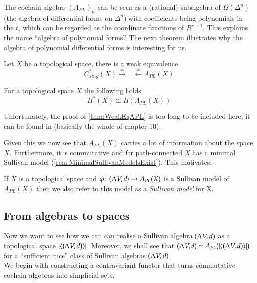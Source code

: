  The cochain algebra ${(A_{PL})}_n$ can be seen as a (rational) subalgebra of 
 $\Omega(\Delta^n)$ (the algebra of differential forms on  $\Delta^n$) with coefficients being polynomials in
 the $t_i$ which can be regarded as the coordinate functions of $R^{n+1}$. This explains the name 
 ``algebra of polynomial forms''.
 The next theorem illustrates why the algebra of polynomial differential forms is interesting for us.
 
 \begin{Theorem}
 \label{thm:WeakEqAPL}
  Let $X$ be a topological space, there is a weak equivalence 
  $${C^*_{sing}(X) \overset{\simeq}{\longrightarrow} \ldots \overset{\simeq}{\longleftarrow} A_{PL}(X)}$$
 \end{Theorem}
 
 \begin{Corollary}
  For a topological space $X$ the following holds
  $$ H^*(X) \cong H(A_{PL}(X)) $$
 \end{Corollary}

 Unfortunately, the proof of \ref{thm:WeakEqAPL} is too long to be included here, it can be found
 in \cite{Felix2001} (basically the whole of chapter 10).

 Given this we now see that $A_{PL}(X)$ carries a lot of information about the space $X$. Furthermore, it is
 commutative and for path-connected $X$ has a minimal Sullivan model (\ref{rem:MinimalSullivanModelsExist}). This
 motivates:
 
 \begin{Definition}
  If $X$ is a topological space and $\varphi \colon (\Lambda V,d) \to A_{PL}(X)$ is a Sullivan model of $A_{PL}(X)$ 
  then we also refer to this model as a \emph{Sullivan model} for X.
 \end{Definition}

 
 
 \subsection{From algebras to spaces}
 
 Now we want to see how we can can realise a Sullivan algebra $(\Lambda V,d)$ as a topological space 
 $| \langle (\Lambda V,d) \rangle |$. Moreover, we shall see that $(\Lambda V,d) \simeq A_{PL}(| \langle (\Lambda V,d) \rangle |)$ for a
 ``sufficient nice'' class of Sullivan algebras $(\Lambda V,d)$. \\
 We begin with constructing a contravariant functor that turns commutative cochain algebras into simplicial sets.
 
